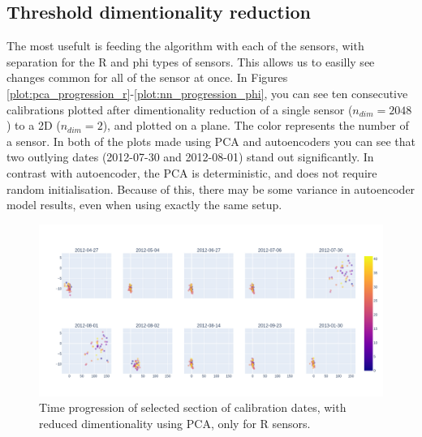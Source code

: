 \subsection{Threshold dimentionality reduction}


The most usefult is feeding the algorithm with each of the sensors, with separation for the R and phi types of sensors.
This allows us to easilly see changes common for all of the sensor at once.
In Figures \ref{plot:pca_progression_r}-\ref{plot:nn_progression_phi}, you can see ten consecutive calibrations plotted after dimentionality reduction of a single sensor ($n_{dim}=2048$) to a 2D ($n_{dim}=2$), and plotted on a plane.
The color represents the number of a sensor.
In both of the plots made using PCA and autoencoders you can see that two outlying dates (2012-07-30 and 2012-08-01) stand out significantly.
In contrast with autoencoder, the PCA is deterministic, and does not require random initialisation. Because of this, there may be some variance in autoencoder model results, even when using exactly the same setup.


\begin{figure}[H]
    \centering
    \includegraphics[width=\linewidth]{figures/chapter4/dimred/PCA_module_R_together.png}
    \caption{Time progression of selected section of calibration dates, with reduced dimentionality using PCA, only for R sensors.}
   \label{plot:pca_progression_phi}
  \end{figure}

